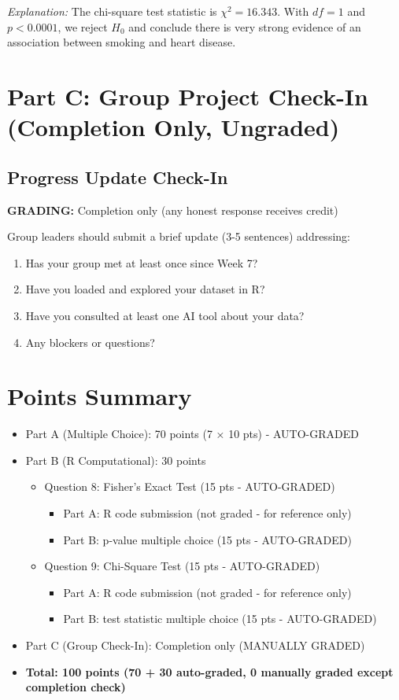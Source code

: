 \documentclass[11pt]{article}
\begin{document}
\textit{Explanation:} The chi-square test statistic is $\chi^2 = 16.343$. With $df = 1$ and $p < 0.0001$, we reject $H_0$ and conclude there is very strong evidence of an association between smoking and heart disease.

\newpage

\section{Part C: Group Project Check-In (Completion Only, Ungraded)}

\subsection*{Progress Update Check-In}

\textbf{GRADING:} Completion only (any honest response receives credit)

Group leaders should submit a brief update (3-5 sentences) addressing:
\begin{enumerate}
\item Has your group met at least once since Week 7?
\item Have you loaded and explored your dataset in R?
\item Have you consulted at least one AI tool about your data?
\item Any blockers or questions?
\end{enumerate}

\vspace{12pt}

\section*{Points Summary}

\begin{itemize}
\item Part A (Multiple Choice): 70 points (7 × 10 pts) - AUTO-GRADED
\item Part B (R Computational): 30 points
  \begin{itemize}
  \item Question 8: Fisher's Exact Test (15 pts - AUTO-GRADED)
    \begin{itemize}
    \item Part A: R code submission (not graded - for reference only)
    \item Part B: p-value multiple choice (15 pts - AUTO-GRADED)
    \end{itemize}
  \item Question 9: Chi-Square Test (15 pts - AUTO-GRADED)
    \begin{itemize}
    \item Part A: R code submission (not graded - for reference only)
    \item Part B: test statistic multiple choice (15 pts - AUTO-GRADED)
    \end{itemize}
  \end{itemize}
\item Part C (Group Check-In): Completion only (MANUALLY GRADED)
\item \textbf{Total: 100 points (70 + 30 auto-graded, 0 manually graded except completion check)}
\end{itemize}
\end{document}
